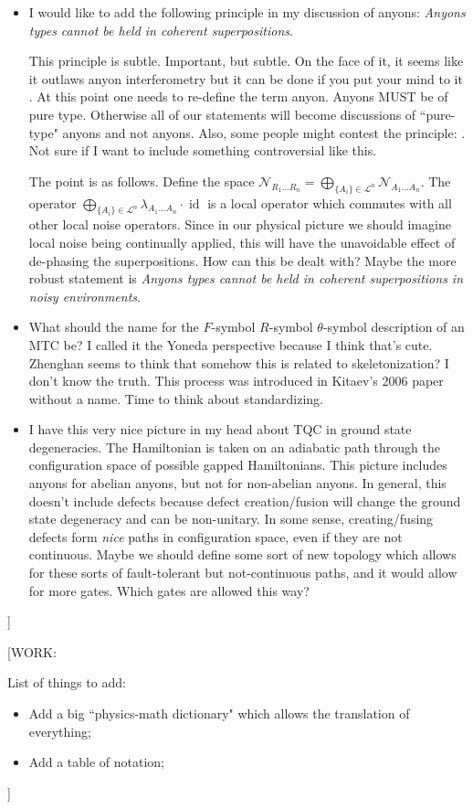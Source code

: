 \documentclass{article}
\theoremstyle{definition}
\DeclareMathOperator{\id}{id}
\newcommand{\NN}{\mathcal{N}}
\newcommand{\LL}{\mathcal{L}}
\newcommand{\0}{\left|0\right>}
\newcommand{\1}{\left|1\right>}
\numberwithin{figure}{section}
\begin{document}
\begin{itemize}
\item I would like to add the following principle in my discussion of anyons: \textit{Anyons types cannot be held in coherent superpositions}.

This principle is subtle. Important, but subtle. On the face of it, it seems like it outlaws anyon interferometry but it can be done if you put your mind to it \cite{bonderson2012non, wei2023thermal}. At this point one needs to re-define the term anyon. Anyons MUST be of pure type. Otherwise all of our  statements will become discussions of ``pure-type" anyons and not anyons. Also, some people might contest the principle: \cite{bonderson2021measuring}. Not sure if I want to include something controversial like this.

The point is as follows. Define the space $\NN_{R_1... R_n}=\bigoplus_{\{A_i\}\in \LL^n}\NN_{A_1... A_n}$. The operator $\bigoplus_{\{A_i\}\in \LL^n} \lambda_{A_1... A_n}\cdot \id$ is a local operator which commutes with all other local noise operators. Since in our physical picture we should imagine local noise being continually applied, this will have the unavoidable effect of de-phasing the superpositions. How can this be dealt with? Maybe the more robust statement is \textit{Anyons types cannot be held in coherent superpositions in noisy environments}.

\item What should the name for the $F$-symbol $R$-symbol $\theta$-symbol description of an MTC be? I called it the Yoneda perspective because I think that's cute. Zhenghan seems to think that somehow this is related to skeletonization? I don't know the truth. This process was introduced in Kitaev's 2006 paper without a name. Time to think about standardizing.

\item I have this very nice picture in my head about TQC in ground state degeneracies. The Hamiltonian is taken on an adiabatic path through the configuration space of possible gapped Hamiltonians. This picture includes anyons for abelian anyons, but not for non-abelian anyons. In general, this doesn't include defects because defect creation/fusion will change the ground state degeneracy and can be non-unitary.  In some sense, creating/fusing defects form \textit{nice} paths in configuration space, even if they are not continuous. Maybe we should define some sort of new topology which allows for these sorts of fault-tolerant but not-continuous paths, and it would allow for more gates. Which gates are allowed this way?

\end{itemize}
]

[WORK:

List of things to add:

\begin{itemize}
\item Add a big ``physics-math dictionary" which allows the translation of everything;
\item Add a table of notation;
\end{itemize}
]



\end{document}
